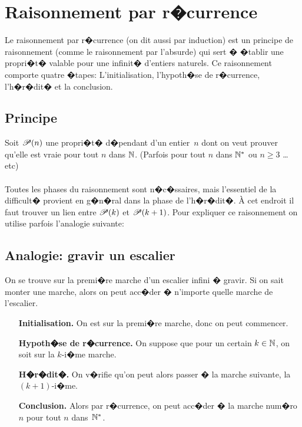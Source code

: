 \section{Raisonnement par r�currence}
Le raisonnement par r�currence (on dit aussi par induction) est un principe de raisonnement (comme le raisonnement par l'absurde) qui sert � �tablir une propri�t� valable pour une infinit� d'entiers naturels. Ce raisonnement comporte quatre �tapes: L'initialisation, l'hypoth�se de r�currence, l'h�r�dit� et la conclusion.
\subsection{Principe}
\noindent Soit $\Para (n)$ une propri�t� d�pendant d'un entier~$n$ dont on veut prouver qu'elle est vraie pour tout $n$ dans $\mathbb{N}$. (Parfois pour tout $n$ dans $\mathbb{N}^*$ ou $n\geq 3$ \dots etc)\medskip\\
\fbox{%

\parbox{0.9\linewidth}{
\begin{itemize}
\item[\bf Initialisation.] On v�rifie que $\Para(0)$ est vraie.
\item[\bf Hypoth�se de r�currence.] On suppose que pour un certain $k\in\N$, $\Para (k)$ est vraie.
\item[\bf H�r�dit�.] On montre que sous l'hypoth�se de r�currence, $\Para (k+1)$ est aussi vraie.
\item[\bf Conclusion.] Alors par r�currence, la propri�t� $\Para (n)$ est vraie pour tout $n\in\N$.
\end{itemize}
}}\medskip\\
Toutes les phases du raisonnement sont n�c�ssaires, mais l'essentiel de la difficult� provient en g�n�ral dans la phase de l'h�r�dit�. \`A cet endroit il faut trouver un lien entre $\Para (k)$ et $\Para (k+1)$.
Pour expliquer ce raisonnement on utilise parfois l'analogie suivante:
\subsection{Analogie: gravir un escalier}
\noindent On se trouve sur la premi�re marche d'un escalier infini � gravir. Si on sait monter une marche, alors on peut acc�der � n'importe quelle marche de l'escalier.
\begin{itemize}
\item[\bf Initialisation.] On est sur la premi�re marche, donc on peut commencer.
\item[\bf Hypoth�se de r�currence.] On suppose que pour un certain $k\in\N$, on soit sur la $k$-i�me marche.
\item[\bf H�r�dit�.] On v�rifie qu'on peut alors passer � la marche suivante, la $(k+1)$-i�me.
\item[\bf Conclusion.] Alors par r�currence, on peut acc�der � la marche num�ro $n$ pour tout $n$ dans~$\mathbb{N}^*$.
\end{itemize}
